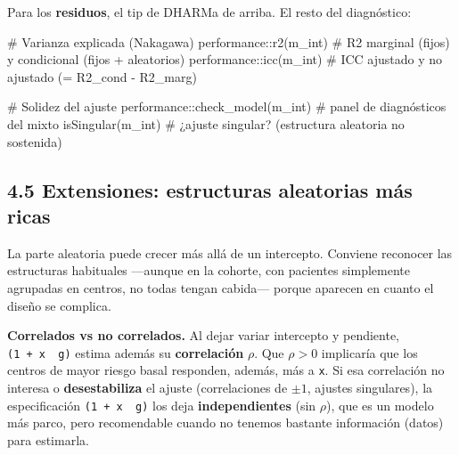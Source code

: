 \documentclass[
  letterpaper,
  DIV=11,
  numbers=noendperiod]{scrartcl}
\newenvironment{Shaded}{\begin{snugshade}}{\end{snugshade}}
\newcommand{\CommentTok}[1]{\textcolor[rgb]{0.37,0.37,0.37}{#1}}
\newcommand{\FunctionTok}[1]{\textcolor[rgb]{0.28,0.35,0.67}{#1}}
\newcommand{\NormalTok}[1]{\textcolor[rgb]{0.00,0.23,0.31}{#1}}
\newcommand{\SpecialCharTok}[1]{\textcolor[rgb]{0.37,0.37,0.37}{#1}}
\begin{document}
\begin{tcolorbox}[enhanced jigsaw, coltitle=black, rightrule=.15mm, arc=.35mm, leftrule=.75mm, colback=white, colbacktitle=quarto-callout-tip-color!10!white, left=2mm, breakable, toptitle=1mm, toprule=.15mm, bottomtitle=1mm, titlerule=0mm, title=\textcolor{quarto-callout-tip-color}{\faLightbulb}\hspace{0.5em}{🔧 En R. Bondad de ajuste y solidez de un GLMM}, bottomrule=.15mm, opacityback=0, opacitybacktitle=0.6, colframe=quarto-callout-tip-color-frame]

Para los \textbf{residuos}, el tip de DHARMa de arriba. El resto del
diagnóstico:

\begin{Shaded}
\begin{Highlighting}[]
\CommentTok{\# Varianza explicada (Nakagawa)}
\NormalTok{performance}\SpecialCharTok{::}\FunctionTok{r2}\NormalTok{(m\_int)        }\CommentTok{\# R2 marginal (fijos) y condicional (fijos + aleatorios)}
\NormalTok{performance}\SpecialCharTok{::}\FunctionTok{icc}\NormalTok{(m\_int)       }\CommentTok{\# ICC ajustado y no ajustado (= R2\_cond {-} R2\_marg)}

\CommentTok{\# Solidez del ajuste}
\NormalTok{performance}\SpecialCharTok{::}\FunctionTok{check\_model}\NormalTok{(m\_int)   }\CommentTok{\# panel de diagnósticos del mixto}
\FunctionTok{isSingular}\NormalTok{(m\_int)                 }\CommentTok{\# ¿ajuste singular? (estructura aleatoria no sostenida)}
\end{Highlighting}
\end{Shaded}

\end{tcolorbox}

\hypertarget{sec-u14-extensiones}{%
\subsection{4.5 Extensiones: estructuras aleatorias más
ricas}\label{sec-u14-extensiones}}

La parte aleatoria puede crecer más allá de un intercepto. Conviene
reconocer las estructuras habituales ---aunque en la cohorte, con
pacientes simplemente agrupadas en centros, no todas tengan cabida---
porque aparecen en cuanto el diseño se complica.

\textbf{Correlados vs no correlados.} Al dejar variar intercepto y
pendiente, \texttt{(1\ +\ x\ \textbar{}\ g)} estima además su
\textbf{correlación} \(\rho\). Que \(\rho>0\) implicaría que los centros
de mayor riesgo basal responden, además, más a \texttt{x}. Si esa
correlación no interesa o \textbf{desestabiliza} el ajuste
(correlaciones de \(\pm1\), ajustes singulares), la especificación
\texttt{(1\ +\ x\ \textbar{}\textbar{}\ g)} los deja
\textbf{independientes} (sin \(\rho\)), que es un modelo más parco, pero
recomendable cuando no tenemos bastante información (datos) para
estimarla.
\end{document}
